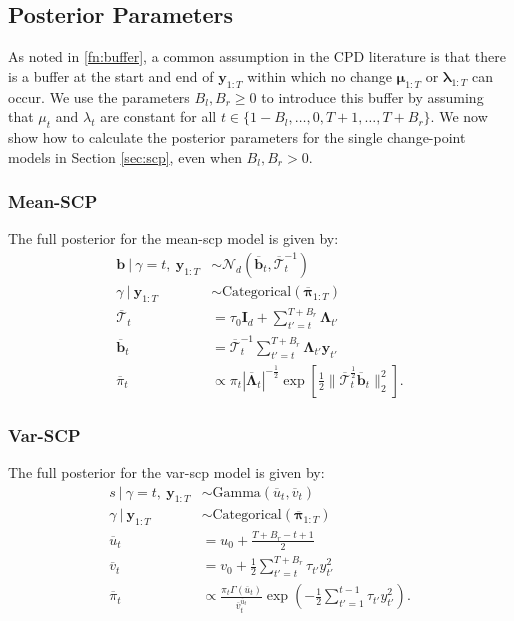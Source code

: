 \subsection{Posterior Parameters}
\label{app:posterior-parameters}

As noted in \ref{fn:buffer}, a common assumption in the CPD literature is that there is a buffer at the start and end of $\mathbf{y}_{1:T}$ within which no change $\boldsymbol{\mu}_{1:T}$ or $\boldsymbol{\lambda}_{1:T}$ can occur. We use the parameters $B_l,B_r \geq 0$ to introduce this buffer by assuming that $\mu_t$ and $\lambda_t$ are constant for all $t\in\{1-B_l,\ldots,0,T+1, \ldots, T+B_r\}$. We now show how to calculate the posterior parameters for the single change-point models in Section \ref{sec:scp}, even when $B_l,B_r > 0$.

\subsubsection{Mean-SCP}

The full posterior for the mean-scp model is given by:
\small
\begin{align*}
    \mathbf{b} \:|\: \gamma = t, \: \mathbf{y}_{1:T} &\sim \mathcal{N}_d\left(\overline{\mathbf{b}}_{t}, \overline{\boldsymbol{\mathcal{T}}}_t^{-1}\right) \\
    \gamma \:|\: \mathbf{y}_{1:T} &\sim \text{Categorical}(\overline{\boldsymbol{\pi}}_{1:T})  \\
    \overline{\boldsymbol{\mathcal{T}}}_t &= \tau_0\mathbf{I}_d + \sum_{t'=t}^{T+B_r} \boldsymbol{\Lambda}_{t'} \\
    \overline{\mathbf{b}}_t &= \overline{\boldsymbol{\mathcal{T}}}_t^{-1}\sum_{t'=t}^{T+B_r} \boldsymbol{\Lambda}_{t'} \mathbf{y}_{t'} \\
    \overline{\pi}_t &\propto \pi_t|\overline{\boldsymbol{\Lambda}}_t|^{-
    \frac{1}{2}}\exp\left[\frac{1}{2}\lVert \overline{\boldsymbol{\mathcal{T}}}_t^{\frac{1}{2}} \overline{\mathbf{b}}_t\rVert_2^2\right].
\end{align*}
\normalsize

\subsubsection{Var-SCP}

The full posterior for the var-scp model is given by:
\small
\begin{align*}
    s \:|\: \gamma = t, \: \mathbf{y}_{1:T} &\sim \text{Gamma}\left(\overline{u}_{t}, \overline{v}_{t}\right) \\
    \gamma \:|\: \mathbf{y}_{1:T}&\sim \text{Categorical}(\overline{\boldsymbol{\pi}}_{1:T}) \\
    \overline{u}_{t} &= u_0 + \frac{T + B_r - t + 1}{2} \\
    \overline{v}_{t} &= v_0 + \frac{1}{2} \sum_{t'=t}^{T+B_r} \tau_{t'}y_{t'}^2 \\
    \overline{\pi}_t &\propto  \frac{\pi_t\Gamma(\overline{u}_{t})}{\overline{v}_{t}^{\overline{u}_{t}}}\exp\left(- \frac{1}{2}\sum_{t'=1}^{t-1} \tau_{t'}y_{t'}^2\right). 
\end{align*}
\normalsize

